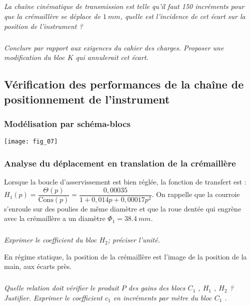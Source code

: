 \begin{multicols}{2}
\subparagraph{}\textit{La chaîne cinématique de transmission est telle qu’il faut 150 incréments pour que la crémaillère se déplace de $\SI{1}{mm}$, quelle est l’incidence de cet écart sur la position de l’instrument ? }
\ifprof
\begin{corrige}
\end{corrige}
\else
\fi


\subparagraph{}\textit{Conclure par rapport aux exigences du cahier des charges.
Proposer une modification du bloc $K$ qui annulerait cet écart.}
\ifprof
\begin{corrige}
\end{corrige}
\else
\fi

\subsection*{Vérification des performances de la chaîne de positionnement de l'instrument}
\subsubsection*{Modélisation par schéma-blocs}

\begin{center}
\texttt{[image: fig\_07]}
\end{center}


\subsubsection*{Analyse du déplacement en translation de la crémaillère}
Lorsque la boucle d’asservissement est bien réglée, la fonction de transfert est : $H_1(p)=\dfrac{\Theta(p)}{\text{Cons}(p)} = \dfrac{0,00035}{1+0,014p+0,00017 p^2}$. 
On rappelle que la courroie s’enroule sur des poulies de même diamètre et que la roue dentée qui engrène avec la crémaillère a un diamètre $\Phi_1 = \SI{38,4}{mm}$.


\subparagraph{}\textit{Exprimer le coefficient du bloc $H_2$; préciser l’unité.}
\ifprof
\begin{corrige}
\end{corrige}
\else
\fi

En régime statique, la position de la crémaillère est l’image de la position de la main, aux écarts près. 

\subparagraph{}\textit{Quelle relation doit vérifier le produit $P$ des gains des blocs $C_1$ , $H_1$ , $H_2$  ? Justifier.
Exprimer le coefficient $c_1$ en incréments par mètre du bloc $C_1$ .
}
\ifprof
\begin{corrige}
\end{corrige}
\else
\fi


\end{multicols}
